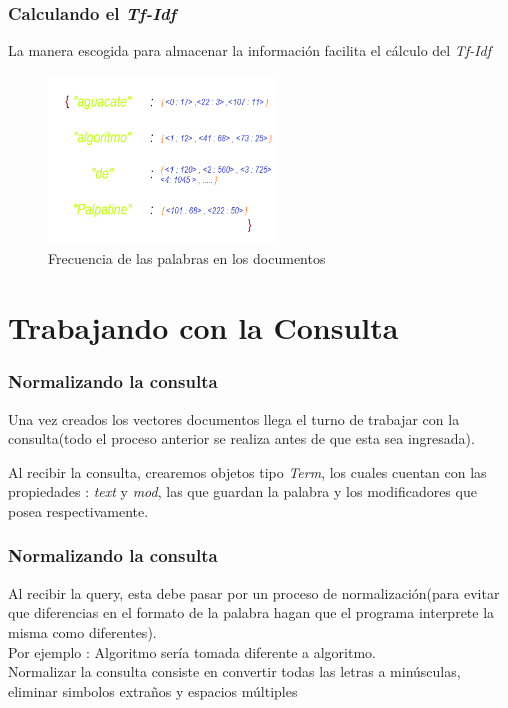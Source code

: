 \documentclass{beamer}
\begin{document}
\begin{frame}
    \frametitle{Calculando el \textit{Tf-Idf}}
    La manera escogida para almacenar la información facilita el cálculo del \textit{Tf-Idf}
    \begin{figure}
        \includegraphics[width = 6cm]{./../images/content.png}
        \caption{Frecuencia de las palabras en los documentos}
    
    \end{figure}
\end{frame}

\section{Trabajando con la Consulta}

\begin{frame}
    \frametitle{Normalizando la consulta}

    Una vez creados los vectores documentos llega el turno de trabajar con la consulta(todo el proceso anterior se 
    realiza antes de que esta sea ingresada).

    Al recibir la consulta, crearemos objetos tipo \textit{Term}, los cuales cuentan con las propiedades : \textit{text} y
    \textit{mod}, las que guardan la palabra y los modificadores que posea respectivamente.
\end{frame}

\begin{frame}
    \frametitle{Normalizando la consulta}
    Al recibir la query, esta debe pasar por un proceso de normalización(para evitar que diferencias en el formato de la palabra
    hagan que el programa interprete la misma como diferentes). \\[20pt]
    
    Por ejemplo : Algoritmo sería tomada diferente a algoritmo.\\[20pt]

    Normalizar la consulta consiste en convertir todas las letras a minúsculas, eliminar simbolos extraños y espacios múltiples
    
\end{frame}
\end{document}
